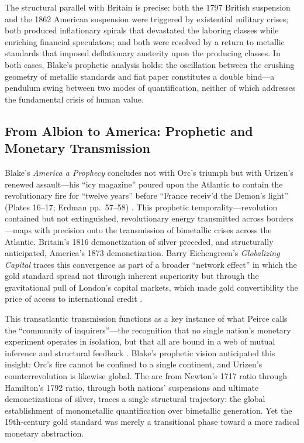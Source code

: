 \documentclass[
]{article}
\begin{document}
The structural parallel with Britain is precise: both the 1797 British
suspension and the 1862 American suspension were triggered by
existential military crises; both produced inflationary spirals that
devastated the laboring classes while enriching financial speculators;
and both were resolved by a return to metallic standards that imposed
deflationary austerity upon the producing classes. In both cases,
Blake's prophetic analysis holds: the oscillation between the crushing
geometry of metallic standards and fiat paper constitutes a double
bind---a pendulum swing between two modes of quantification, neither of
which addresses the fundamental crisis of human value.

\subsection{From Albion to America: Prophetic and Monetary
Transmission}\label{from-albion-to-america-prophetic-and-monetary-transmission}

Blake's \emph{America a Prophecy} concludes not with Orc's triumph but
with Urizen's renewed assault---his ``icy magazine'' poured upon the
Atlantic to contain the revolutionary fire for ``twelve years'' before
``France receiv'd the Demon's light'' (Plates 16--17; Erdman pp.~57--58)
\citep{erdman1988complete, blake1793america}. This prophetic
temporality---revolution contained but not extinguished, revolutionary
energy transmitted across borders---maps with precision onto the
transmission of bimetallic crises across the Atlantic. Britain's 1816
demonetization of silver preceded, and structurally anticipated,
America's 1873 demonetization. Barry Eichengreen's \emph{Globalizing
Capital} traces this convergence as part of a broader ``network effect''
in which the gold standard spread not through inherent superiority but
through the gravitational pull of London's capital markets, which made
gold convertibility the price of access to international credit
\citep{eichengreen2019globalizing}.

This transatlantic transmission functions as a key instance of what
Peirce calls the ``community of inquirers''---the recognition that no
single nation's monetary experiment operates in isolation, but that all
are bound in a web of mutual inference and structural feedback
\citep{friedman2026blake}. Blake's prophetic vision anticipated this
insight: Orc's fire cannot be confined to a single continent, and
Urizen's counterrevolution is likewise global. The arc from Newton's
1717 ratio through Hamilton's 1792 ratio, through both nations'
suspensions and ultimate demonetizations of silver, traces a single
structural trajectory: the global establishment of monometallic
quantification over bimetallic generation. Yet the 19th-century gold
standard was merely a transitional phase toward a more radical monetary
abstraction.
\end{document}
